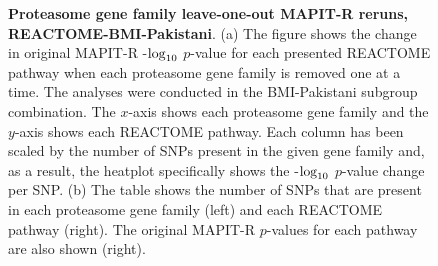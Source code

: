 \documentclass[10pt,a4paper]{article}
\def\log{{\rm log}}
\begin{document}
\begin{figure}[ht]
\label{InterPath-Supp-Figure-Prot-Heatplots-Indian}
\end{figure}
\clearpage
\addtocounter{figure}{-1}
\addtocounter{CharNumber5}{1}

\begin{figure}[ht]
\centering
\vspace*{-.5cm}
\par
{}
\caption[TBD]{\textbf{Proteasome gene family leave-one-out MAPIT-R reruns, REACTOME-BMI-Pakistani}. (a) The figure shows the change in original MAPIT-R -$\log_{10}$ $p$-value for each presented REACTOME pathway when each proteasome gene family is removed one at a time. The analyses were conducted in the BMI-Pakistani subgroup combination. The $x$-axis shows each proteasome gene family and the $y$-axis shows each REACTOME pathway. Each column has been scaled by the number of SNPs present in the given gene family and, as a result, the heatplot specifically shows the -$\log_{10}$ $p$-value change per SNP. (b) The table shows the number of SNPs that are present in each proteasome gene family (left) and each REACTOME pathway (right). The original MAPIT-R $p$-values for each pathway are also shown (right).}

\end{figure}
\end{document}

